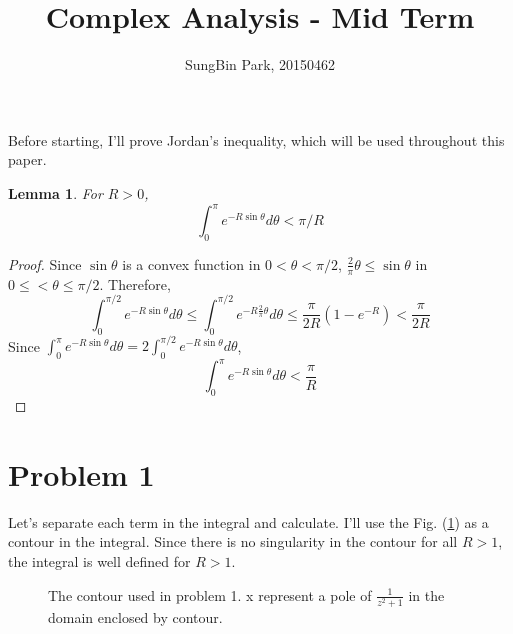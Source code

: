\documentclass{article}
\newtheorem{lemma}{Lemma}
\begin{document}
\title{Complex Analysis - Mid Term}
\author{SungBin Park, 20150462} 

\maketitle
Before starting, I'll prove Jordan's inequality, which will be used throughout this paper.
\begin{lemma}
For $R>0$,
\begin{equation*}
\int_0^\pi e^{-R\sin{\theta}}d\theta < \pi/R
\end{equation*}
\end{lemma}
\begin{proof}
Since $\sin{\theta}$ is a convex function in $0<\theta<\pi/2$, $\frac{2}{\pi}\theta\leq \sin{\theta}$ in $0\leq<\theta\leq \pi/2$. Therefore,
\begin{equation*}
\int_0^{\pi/2} e^{-R\sin{\theta}}d\theta \leq \int_0^{\pi/2} e^{-R\frac{2}{\pi}\theta}d\theta \leq \frac{\pi}{2R}\left(1-e^{-R}\right)<\frac{\pi}{2R}
\end{equation*}
Since $\int_0^\pi e^{-R\sin{\theta}}d\theta=2\int_0^{\pi/2} e^{-R\sin{\theta}}d\theta$,
\begin{equation*}
\int_0^\pi e^{-R\sin{\theta}}d\theta<\frac{\pi}{R}
\end{equation*}
\end{proof}
\section*{Problem 1}
Let's separate each term in the integral and calculate. I'll use the Fig. (\ref{Fig:P1}) as a contour in the integral. Since there is no singularity in the contour for all $R>1$, the integral is well defined for $R>1$.
\begin{figure}[h]
\centering
{}
\caption{The contour used in problem 1. x represent a pole of $\frac{1}{z^2+1}$ in the domain enclosed by contour.}
\label{Fig:P1}
\end{figure}
\end{document}

